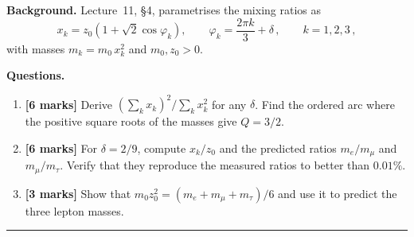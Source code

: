 \documentclass[11pt,a4paper]{article}
\begin{document}
\noindent\textbf{Background.}
Lecture~11, \S4, parametrises the mixing ratios as
\begin{equation}\label{eq:z3-ex}
  x_k = z_0\left(1+\sqrt{2}\cos\varphi_k\right),
  \qquad \varphi_k = \frac{2\pi k}{3}+\delta\,,
  \qquad k = 1,2,3\,,
\end{equation}
with masses $m_k = m_0\,x_k^2$ and $m_0,z_0>0$.

\medskip

\noindent\textbf{Questions.}
\begin{enumerate}[label=(\alph*)]
  \item \textbf{[6 marks]}
    Derive $(\sum_k x_k)^2/\sum_k x_k^2$ for any $\delta$.  Find
    the ordered arc where the positive square roots of the masses
    give $Q=3/2$.
  \item \textbf{[6 marks]}
    For $\delta = 2/9$, compute $x_k/z_0$ and the predicted ratios
    $m_e/m_\mu$ and $m_\mu/m_\tau$.  Verify that they reproduce the
    measured ratios to better than $0.01\%$.
  \item \textbf{[3 marks]}
    Show that $m_0 z_0^2 = (m_e+m_\mu+m_\tau)/6$ and use it to predict
    the three lepton masses.
\end{enumerate}


\bigskip
\hrule
\bigskip
\end{document}
